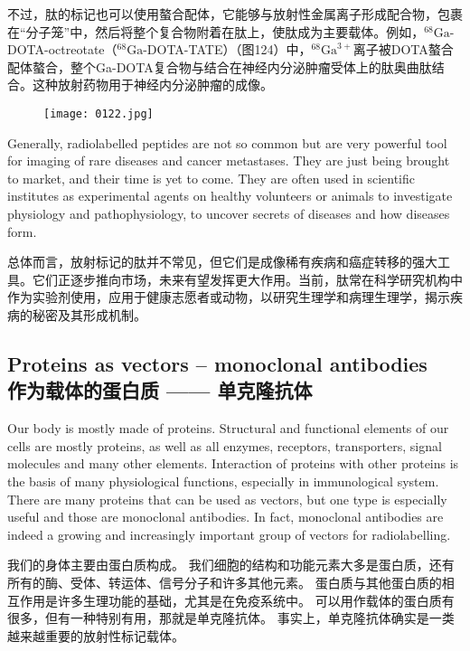 \documentclass[dvipsnames, svgnames,a4paper,11pt]{article}
\begin{document}
不过，肽的标记也可以使用螯合配体，它能够与放射性金属离子形成配合物，包裹在“分子笼”中，然后将整个复合物附着在肽上，使肽成为主要载体。例如，${}^{68}\mathrm{Ga}$-DOTA-octreotate（${}^{68}\mathrm{Ga}$-DOTA-TATE）（图124）中，${}^{68}\mathrm{Ga}^{3+}$离子被DOTA螯合配体螯合，整个Ga-DOTA复合物与结合在神经内分泌肿瘤受体上的肽奥曲肽结合。这种放射药物用于神经内分泌肿瘤的成像。

\begin{figure}[h]
    \centering
    \texttt{[image: 0122.jpg]}
     \label{fig124}
\end{figure}

Generally, radiolabelled peptides are not so common but are very powerful tool for
imaging of rare diseases and cancer metastases. They are just being brought to
market, and their time is yet to come. They are often used in scientific institutes as
experimental agents on healthy volunteers or animals to investigate physiology and
pathophysiology, to uncover secrets of diseases and how diseases form.

总体而言，放射标记的肽并不常见，但它们是成像稀有疾病和癌症转移的强大工具。它们正逐步推向市场，未来有望发挥更大作用。当前，肽常在科学研究机构中作为实验剂使用，应用于健康志愿者或动物，以研究生理学和病理生理学，揭示疾病的秘密及其形成机制。

\subsection{Proteins as vectors – monoclonal antibodies \\作为载体的蛋白质 —— 单克隆抗体}
Our body is mostly made of proteins. Structural and functional elements of our cells
are mostly proteins, as well as all enzymes, receptors, transporters, signal molecules
and many other elements. Interaction of proteins with other proteins is the basis of
many physiological functions, especially in immunological system. There are many
proteins that can be used as vectors, but one type is especially useful and those are
monoclonal antibodies. In fact, monoclonal antibodies are indeed a growing and
increasingly important group of vectors for radiolabelling.

我们的身体主要由蛋白质构成。 我们细胞的结构和功能元素大多是蛋白质，还有所有的酶、受体、转运体、信号分子和许多其他元素。 蛋白质与其他蛋白质的相互作用是许多生理功能的基础，尤其是在免疫系统中。 可以用作载体的蛋白质有很多，但有一种特别有用，那就是单克隆抗体。 事实上，单克隆抗体确实是一类越来越重要的放射性标记载体。
\end{document}
